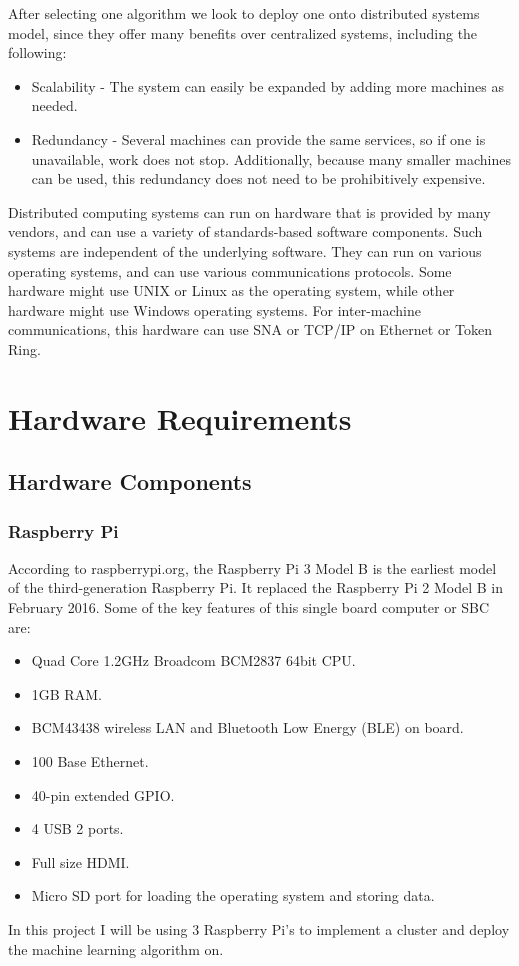 \documentclass[12pt]{article}
\begin{document}
After selecting one algorithm we look to deploy one onto distributed systems model\cite{IBM}, since they offer many benefits over centralized systems, including the following:
\begin{itemize}
\item
Scalability - The system can easily be expanded by adding more machines as needed.
\item
Redundancy - Several machines can provide the same services, so if one is unavailable, work does not stop. Additionally, because many smaller machines can be used, this redundancy does not need to be prohibitively expensive.
\end{itemize}
Distributed computing systems can run on hardware that is provided by many vendors, and can use a variety of standards-based software components. Such systems are independent of the underlying software. They can run on various operating systems, and can use various communications protocols. Some hardware might use UNIX or Linux as the operating system, while other hardware might use Windows operating systems. For inter-machine communications, this hardware can use SNA or TCP/IP on Ethernet or Token Ring.


\clearpage
\newpage
\section{Hardware Requirements}
\subsection{Hardware Components}
\subsubsection{Raspberry Pi}
According to raspberrypi.org\cite{rpi}, the Raspberry Pi 3 Model B is the earliest model of the third-generation Raspberry Pi. It replaced the Raspberry Pi 2 Model B in February 2016. Some of the key features of this single board computer or SBC are:
\begin{itemize}
\item Quad Core 1.2GHz Broadcom BCM2837 64bit CPU.
\item 1GB RAM.
\item BCM43438 wireless LAN and Bluetooth Low Energy (BLE) on board.
\item 100 Base Ethernet.
\item 40-pin extended GPIO.
\item 4 USB 2 ports.
\item Full size HDMI.
\item Micro SD port for loading the operating system and storing data.
\end{itemize}
In this project I will be using 3 Raspberry Pi's to implement a cluster and deploy the machine learning algorithm on.
\end{document}
